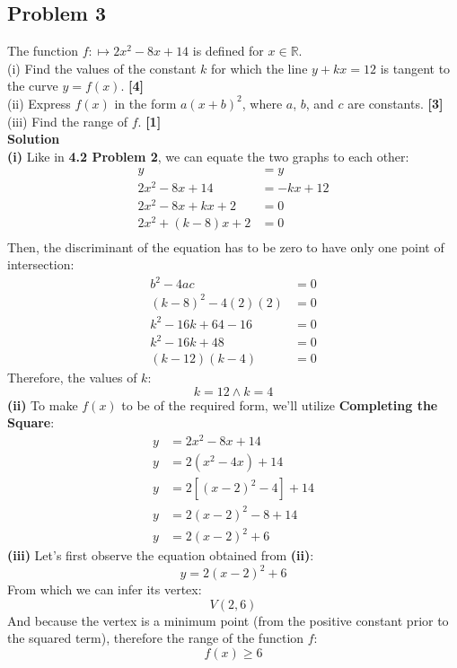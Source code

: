 \documentclass[hidelinks, a4paper, 12pt]{article}
\newcommand{\bd}{\textbf}
\newcommand{\n}{\\[\baselineskip]}
\newcommand{\real}{\mathbb{R}}
\begin{document}
        \subsection{Problem 3}
            The function $f:\mapsto 2x^2 - 8x + 14$ is defined for $x \in \real$.\n
            (i) Find the values of the constant $k$ for which the line $y + kx= 12$ is tangent to the curve $y = f(x)$. \bd{[4]}\n
            (ii) Express $f(x)$ in the form $a(x+b)^2$, where $a$, $b$, and $c$ are constants. \bd{[3]}\n
            (iii) Find the range of $f$. \bd{[1]}\n
            \bd{Solution}\n
            \bd{(i)} Like in \bd{4.2 Problem 2}, we can equate the two graphs to each other:
            \[\begin{split}
                y &= y\\
                2x^2 - 8x + 14 &= -kx + 12\\
                2x^2-8x+kx+2 &= 0\\
                2x^2+(k-8)x+2 &= 0\\
            \end{split}\]
            Then, the discriminant of the equation has to be zero to have only one point of intersection:
            \[\begin{split}
                b^2 - 4ac &= 0\\
                (k-8)^2 - 4(2)(2) &= 0\\
                k^2 - 16k + 64 - 16 &= 0\\
                k^2 - 16k + 48 &= 0\\
                (k-12)(k-4) &= 0
            \end{split}\]
            Therefore, the values of $k$:
            \[k=12 \land k=4\]
            \bd{(ii)} To make $f(x)$ to be of the required form, we'll utilize \bd{Completing the Square}:
            \[\begin{split}
                y &= 2x^2 - 8x + 14\\
                y &= 2(x^2 - 4x) + 14\\
                y &= 2[(x-2)^2 - 4] + 14\\
                y &= 2(x-2)^2 - 8 + 14\\
                y &= 2(x-2)^2 + 6
            \end{split}\]
            \bd{(iii)} Let's first observe the equation obtained from \bd{(ii)}:
            \[y = 2(x-2)^2 + 6\]
            From which we can infer its vertex:
            \[V(2, 6)\]
            And because the vertex is a minimum point (from the positive constant prior to the squared term), therefore the range of the function $f$:
            \[f(x) \geq 6\]
        
\end{document}
